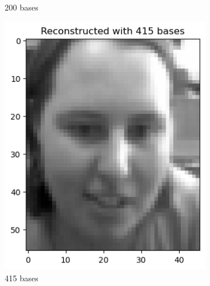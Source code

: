 \begin{figure}[htbp]
\begin{subfigure}[t]{0.2\linewidth}
		\caption{200 bases}
		\label{fig:train_re_200}
	\end{subfigure}
    \hfill
	\begin{subfigure}[t]{0.2\linewidth}
		\centering
		\includegraphics[width=\linewidth]{image/q1_recon_train_415.png}
		\caption{415 bases}
		\label{fig:train_re_415}
	\end{subfigure}
    \hfill
	\begin{subfigure}[t]{0.2\linewidth}
		\centering

\end{subfigure}
\end{figure}
